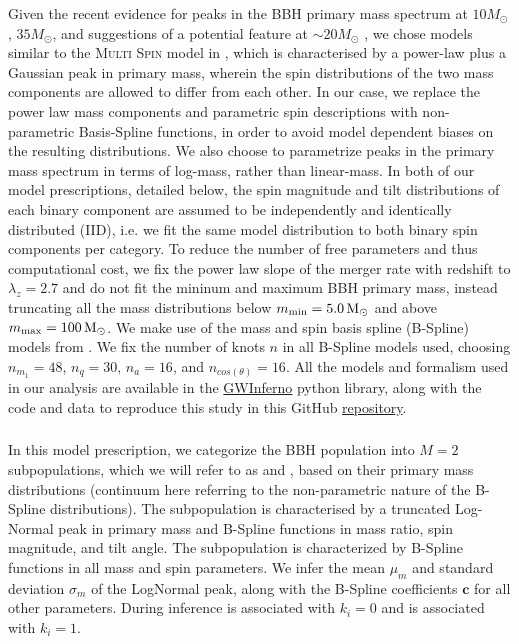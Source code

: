 Given the recent evidence for peaks in the BBH primary mass spectrum at $10 M_{\odot}$, $35 M_{\odot}$, and suggestions of a potential feature at $\sim20 M_{\odot}$ \citep{10.3847/2041-8213/aa9bf6, 10.3847/1538-4357/aab34c, 10.3847/2041-8213/ab3800, 2021ApJ...913L...7A, 2111.03634, 2022ApJ...928..155T,2022arXiv221012834E}, we chose models similar to the \textsc{Multi Spin} model in \cite{2021ApJ...913L...7A}, which is characterised by a power-law plus a Gaussian peak in primary mass, wherein the spin distributions of the two mass components are allowed to differ from each other. In our case, we replace the power law mass components and parametric spin descriptions with non-parametric Basis-Spline functions, in order to avoid model dependent biases on the resulting distributions.
We also choose to parametrize peaks in the primary mass spectrum in terms of log-mass, rather than linear-mass. 
In both of our model prescriptions, detailed below, the spin magnitude and tilt distributions of each binary component are assumed to be independently and identically distributed (IID), i.e. we fit the same model distribution to both binary spin components per category. To reduce the number of free parameters and thus computational cost, we fix the power law slope of the merger rate with redshift to $\lambda_z=2.7$ and do not fit the mininum and maximum BBH primary mass, instead truncating all the mass distributions below $m_\text{min} = 5.0{\,\rm M}_\odot$ and above $m_\text{max} = 100{\,\rm M}_\odot$. We make use of the mass and spin basis spline (B-Spline) models from \cite{2022arXiv221012834E}. We fix the number of knots $n$ in all B-Spline models used, choosing $n_{m_1}=48$, $n_{q}=30$, $n_a=16$, and $n_{cos(\theta)}=16$. All the models and formalism used in our analysis are available in the \href{https://git.ligo.org/bruce.edelman/gwinferno}{GWInferno} python library, along with the code and data to reproduce this study in this GitHub \href{https://github.com/jaxeng/paper}{repository}. 



\subsubsection{\base{}}
In this model prescription, we categorize the BBH population into $M=2$ subpopulations, which we will refer to as \first{} and \contB{}, based on their primary mass distributions (continuum here referring to the non-parametric nature of the B-Spline distributions). The \first{} subpopulation is characterised by a truncated Log-Normal peak in primary mass and B-Spline functions in mass ratio, spin magnitude, and tilt angle. The \contB{} subpopulation is characterized by B-Spline functions in all mass and spin parameters. We infer the mean $\mu_m$ and standard deviation $\sigma_m$ of the LogNormal peak, along with the B-Spline coefficients $\mathbf{c}$ for all other parameters. During inference \first{} is associated with $k_i = 0$ and \contB{} is associated with $k_i = 1$.

